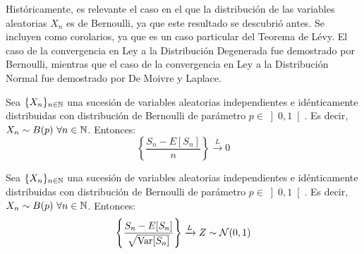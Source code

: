 Históricamente, es relevante el caso en el que la distribución de las variables aleatorias $X_n$ es de Bernoulli, ya que este resultado se descubrió antes. Se incluyen como corolarios, ya que es un caso particular del Teorema de Lévy. El caso de la convergencia en Ley a la Distribución Degenerada fue demostrado por Bernoulli, mientras que el caso de la convergencia en Ley a la Distribución Normal fue demostrado por De Moivre y Laplace.
\begin{coro}
    Sea $\{X_n\}_{n\in \mathbb{N}}$ una sucesión de variables aleatorias independientes e idénticamente distribuidas con distribución de Bernoulli de parámetro $p\in \left]0,1\right[$. Es decir, $X_n\sim B(p)~\forall n\in \mathbb{N}$. Entonces:
    \begin{equation*}
        \left\{\frac{S_n - E[S_n]}{n}\right\} \xrightarrow{L} 0
    \end{equation*}
\end{coro}
\begin{coro}
    Sea $\{X_n\}_{n\in \mathbb{N}}$ una sucesión de variables aleatorias independientes e idénticamente distribuidas con distribución de Bernoulli de parámetro $p\in \left]0,1\right[$. Es decir, $X_n\sim B(p)~\forall n\in \mathbb{N}$. Entonces:
    \begin{equation*}
        \left\{\frac{S_n - E[S_n]}{\sqrt{\operatorname{Var}[S_n]}}\right\} \xrightarrow{L} Z\sim \mathcal{N}(0,1)
    \end{equation*}
\end{coro}